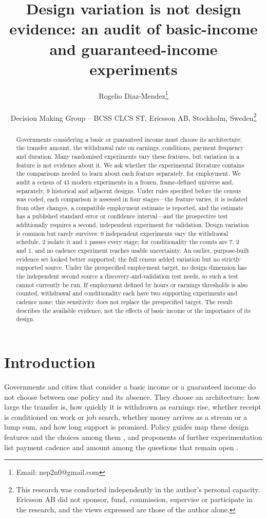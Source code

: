 \documentclass[11pt]{article}
\title{Design variation is not design evidence: an %
audit of basic-income and guaranteed-income experiments}
\author{Rogelio Diaz-Mendez\thanks{Email: nep2n0@gmail.com}\\\ \\Decision Making Group -- BCSS CLCS ST, Ericsson AB, Stockholm, Sweden\thanks{This research was 
conducted independently in the author's personal capacity. Ericsson AB did not 
sponsor, fund, commission, supervise or participate in the research, and the views expressed are those of the author alone.}}
\begin{document}
\maketitle

\begin{abstract}
\noindent Governments considering a basic or guaranteed income must choose its architecture: the transfer amount, the withdrawal rate on earnings, conditions, payment frequency and duration. Many randomised experiments vary these features, but variation in a feature is not evidence about it. We ask whether the experimental literature contains the comparisons needed to learn about each feature separately, for employment. We audit a census of 43 modern experiments in a frozen, frame-defined universe and, separately, 9 historical and adjacent designs. %
Under rules specified before the census was coded, each comparison is assessed in four stages---the feature varies, it is isolated from other changes, a compatible employment estimate is reported, and the estimate has a published standard error or confidence interval---and the prospective test additionally requires a second, independent experiment for validation. Design variation is common but rarely survives: 9 independent experiments vary the withdrawal schedule, 2 isolate it and 1 passes every stage; for conditionality the counts are 7, 2 and 1, and no cadence experiment reaches usable uncertainty. %
An earlier, purpose-built evidence set looked better supported; the full census added variation but no strictly supported source. Under the prespecified employment target, no design dimension has the independent second source a discovery-and-validation test needs, so such a test cannot currently be run. If employment defined by hours or earnings thresholds is also counted, withdrawal and conditionality each have two supporting experiments and cadence none; this sensitivity does not replace the prespecified target. The result describes the available evidence, not the effects of basic income or the importance of its design.
\end{abstract}

\section{Introduction}

Governments and cities that consider a basic income or a guaranteed income do not choose between one policy and its absence. They choose an architecture: how large the transfer is, how quickly it is withdrawn as earnings rise, whether receipt is conditioned on work or job search, whether money arrives as a stream or a lump sum, and how long support is promised. Policy guides map these design features and the choices among them \citep{gentilini2020}, and proponents of further experimentation list payment cadence and amount among the questions that remain open \citep{castro2022}.
\end{document}
